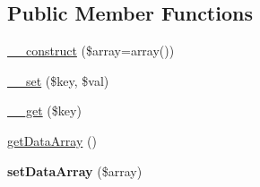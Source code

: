 \subsection*{Public Member Functions}
\begin{DoxyCompactItemize}
\item 
\hyperlink{classTk_1_1Util_1_1ArrayObject_a889d3623fa2dbc6dbc73e35b9c67b538}{\+\_\+\+\_\+construct} (\$array=array())
\item 
\hyperlink{classTk_1_1Util_1_1ArrayObject_ad552b43ac6b610563a7d76d77c935c61}{\+\_\+\+\_\+set} (\$key, \$val)
\item 
\hyperlink{classTk_1_1Util_1_1ArrayObject_aa7e636c8f5f740b101803b582aa080fe}{\+\_\+\+\_\+get} (\$key)
\item 
\hyperlink{classTk_1_1Util_1_1ArrayObject_af07b27b491bf7c31da98586c77c85b27}{get\+Data\+Array} ()
\item 
\hypertarget{classTk_1_1Util_1_1ArrayObject_a02088386acfd52543e241b2ea4e2fad8}{{\bfseries set\+Data\+Array} (\$array)}\label{classTk_1_1Util_1_1ArrayObject_a02088386acfd52543e241b2ea4e2fad8}


\end{DoxyCompactItemize}
